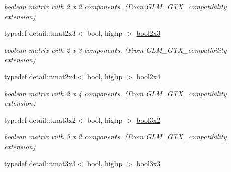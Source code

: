 \begin{CompactItemize}
\begin{CompactList}\small\item\em boolean matrix with 2 x 2 components. (From GLM\_\-GTX\_\-compatibility extension) \item\end{CompactList}\item 
\hypertarget{group__gtx__compatibility_g75013772bb088d107a1c1a994e7f9b14}{
typedef detail::tmat2x3$<$ bool, highp $>$ \hyperlink{group__gtx__compatibility_g75013772bb088d107a1c1a994e7f9b14}{bool2x3}}
\label{group__gtx__compatibility_g75013772bb088d107a1c1a994e7f9b14}

\begin{CompactList}\small\item\em boolean matrix with 2 x 3 components. (From GLM\_\-GTX\_\-compatibility extension) \item\end{CompactList}\item 
\hypertarget{group__gtx__compatibility_gf24096d8a88d274b94002386a3fcab0c}{
typedef detail::tmat2x4$<$ bool, highp $>$ \hyperlink{group__gtx__compatibility_gf24096d8a88d274b94002386a3fcab0c}{bool2x4}}
\label{group__gtx__compatibility_gf24096d8a88d274b94002386a3fcab0c}

\begin{CompactList}\small\item\em boolean matrix with 2 x 4 components. (From GLM\_\-GTX\_\-compatibility extension) \item\end{CompactList}\item 
\hypertarget{group__gtx__compatibility_gcf961fda4c64459911f552cbffdbffa8}{
typedef detail::tmat3x2$<$ bool, highp $>$ \hyperlink{group__gtx__compatibility_gcf961fda4c64459911f552cbffdbffa8}{bool3x2}}
\label{group__gtx__compatibility_gcf961fda4c64459911f552cbffdbffa8}

\begin{CompactList}\small\item\em boolean matrix with 3 x 2 components. (From GLM\_\-GTX\_\-compatibility extension) \item\end{CompactList}\item 
\hypertarget{group__gtx__compatibility_ge9cc5d3d9c72543e303af4d702bf7b40}{
typedef detail::tmat3x3$<$ bool, highp $>$ \hyperlink{group__gtx__compatibility_ge9cc5d3d9c72543e303af4d702bf7b40}{bool3x3}}
\label{group__gtx__compatibility_ge9cc5d3d9c72543e303af4d702bf7b40}


\end{CompactItemize}
